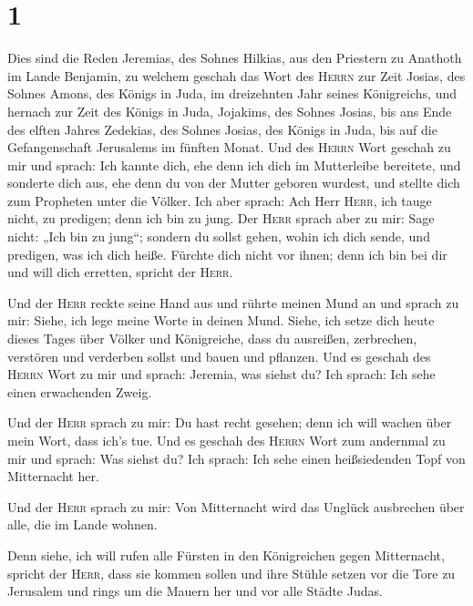\hypertarget{section}{%
\section{1}\label{section}}

 Dies sind die Reden Jeremias, des Sohnes Hilkias, aus den
Priestern zu Anathoth im Lande Benjamin,  zu welchem
geschah das Wort des \textsc{Herrn} zur Zeit Josias, des Sohnes Amons,
des Königs in Juda, im dreizehnten Jahr seines Königreichs,
 und hernach zur Zeit des Königs in Juda, Jojakims, des
Sohnes Josias, bis ans Ende des elften Jahres Zedekias, des Sohnes
Josias, des Königs in Juda, bis auf die Gefangenschaft Jerusalems im
fünften Monat.  Und des \textsc{Herrn} Wort geschah zu mir
und sprach:  Ich kannte dich, ehe denn ich dich im
Mutterleibe bereitete, und sonderte dich aus, ehe denn du von der Mutter
geboren wurdest, und stellte dich zum Propheten unter die Völker.
 Ich aber sprach: Ach Herr \textsc{Herr}, ich tauge nicht,
zu predigen; denn ich bin zu jung.  Der \textsc{Herr}
sprach aber zu mir: Sage nicht: „Ich bin zu jung``; sondern du sollst
gehen, wohin ich dich sende, und predigen, was ich dich heiße.
 Fürchte dich nicht vor ihnen; denn ich bin bei dir und
will dich erretten, spricht der \textsc{Herr}.

 Und der \textsc{Herr} reckte seine Hand aus und rührte
meinen Mund an und sprach zu mir: Siehe, ich lege meine Worte in deinen
Mund.  Siehe, ich setze dich heute dieses Tages über
Völker und Königreiche, dass du ausreißen, zerbrechen, verstören und
verderben sollst und bauen und pflanzen.  Und es geschah
des \textsc{Herrn} Wort zu mir und sprach: Jeremia, was siehst du? Ich
sprach: Ich sehe einen erwachenden Zweig.

 Und der \textsc{Herr} sprach zu mir: Du hast recht
gesehen; denn ich will wachen über mein Wort, dass ich's tue.
 Und es geschah des \textsc{Herrn} Wort zum andernmal zu
mir und sprach: Was siehst du? Ich sprach: Ich sehe einen heißsiedenden
Topf von Mitternacht her.

 Und der \textsc{Herr} sprach zu mir: Von Mitternacht
wird das Unglück ausbrechen über alle, die im Lande wohnen.

 Denn siehe, ich will rufen alle Fürsten in den
Königreichen gegen Mitternacht, spricht der \textsc{Herr}, dass sie
kommen sollen und ihre Stühle setzen vor die Tore zu Jerusalem und rings
um die Mauern her und vor alle Städte Judas.

